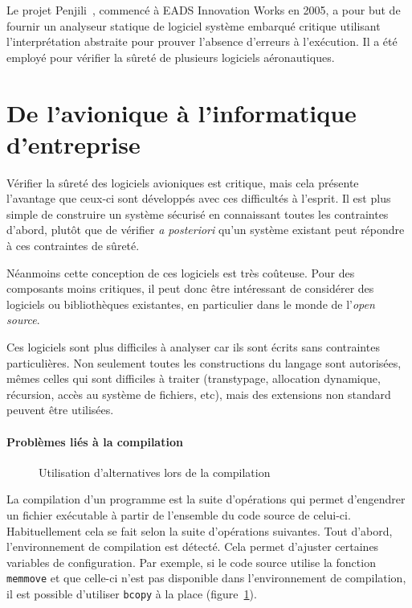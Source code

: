 
Le projet Penjili~\cite{AllamigeonHymansSSTIC07}, commencé à EADS Innovation
Works en 2005, a pour but de fournir un analyseur statique de logiciel système
embarqué critique utilisant l'interprétation abstraite pour prouver l'absence
d'erreurs à l'exécution. Il a été employé pour vérifier la sûreté de plusieurs
logiciels aéronautiques.

\section{De l'avionique à l'informatique d'entreprise}

Vérifier la sûreté des logiciels avioniques est critique, mais cela présente
l'avantage que ceux-ci sont développés avec ces difficultés à l'esprit. Il est
plus simple de construire un système sécurisé en connaissant toutes les
contraintes d'abord, plutôt que de vérifier \emph{a posteriori} qu'un système
existant peut répondre à ces contraintes de sûreté.

Néanmoins cette conception de ces logiciels est très coûteuse. Pour des
composants moins critiques, il peut donc être intéressant de considérer des
logiciels ou bibliothèques existantes, en particulier dans le monde de
l'\emph{open source}.

Ces logiciels sont plus difficiles à analyser car ils sont écrits sans
contraintes particulières. Non seulement toutes les constructions du langage
sont autorisées, mêmes celles qui sont difficiles à traiter (transtypage,
allocation dynamique, récursion, accès au système de fichiers, etc), mais des
extensions non standard peuvent être utilisées.

\paragraph{Problèmes liés à la compilation}

\begin{figure}%
    \centering

    \caption{Utilisation d'alternatives lors de la compilation}
    \label{fig:bcopy}
\end{figure}%

La compilation d'un programme est la suite d'opérations qui permet d'engendrer
un fichier exécutable à partir de l'ensemble du code source de celui-ci.
Habituellement cela se fait selon la suite d'opérations suivantes. Tout d'abord,
l'environnement de compilation est détecté. Cela permet d'ajuster certaines
variables de configuration. Par exemple, si le code source utilise la fonction
\texttt{memmove} et que celle-ci n'est pas disponible dans l'environnement de
compilation, il est possible d'utiliser \texttt{bcopy} à la place
(figure~\ref{fig:bcopy}).

